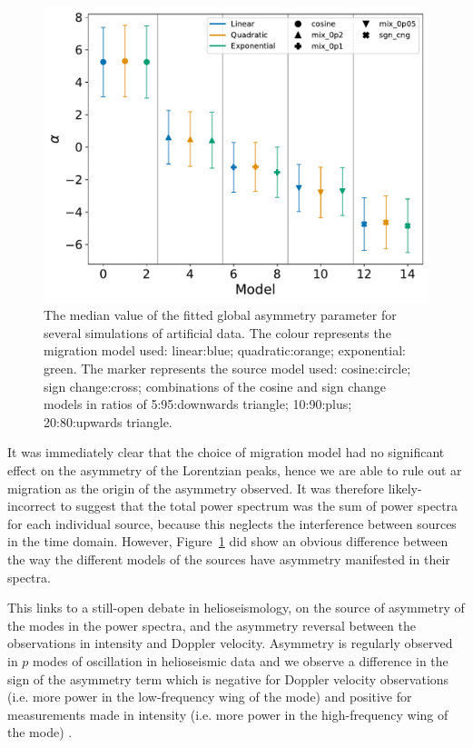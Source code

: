 \begin{figure}[ht!]
	\centering
	\includegraphics[width=0.85\columnwidth]{artificial_fit_asym.pdf}
	\caption{The median value of the fitted global asymmetry parameter for several simulations of artificial data. The colour represents the migration model used: linear:blue; quadratic:orange; exponential: green. The marker represents the source model used: cosine:circle; sign change:cross; combinations of the cosine and sign change models in ratios of 5:95:downwards triangle; 10:90:plus; 20:80:upwards triangle.}
	\label{fig:artificial_asymm}
\end{figure}

It was immediately clear that the choice of migration model had no significant effect on the asymmetry of the Lorentzian peaks, hence we are able to rule out \gls{ar} migration as the origin of the asymmetry observed. It was therefore likely-incorrect to suggest that the total power spectrum was the sum of power spectra for each individual source, because this neglects the interference between sources in the time domain. However, Figure~\ref{fig:artificial_asymm} did show an obvious difference between the way the different models of the sources have asymmetry manifested in their spectra.

This links to a still-open debate in helioseismology, on the source of asymmetry of the modes in the power spectra, and the asymmetry reversal between the observations in intensity and Doppler velocity. Asymmetry is regularly observed in $p$ modes of oscillation in helioseismic data and we observe a difference in the sign of the asymmetry term which is negative for Doppler velocity observations (i.e. more power in the low-frequency wing of the mode) and positive for measurements made in intensity (i.e. more power in the high-frequency wing of the mode) \citep{duvall_asymmetries_1993, chaplin_depth_1999, howe_validation_2015, basu_asteroseismic_2017}.

